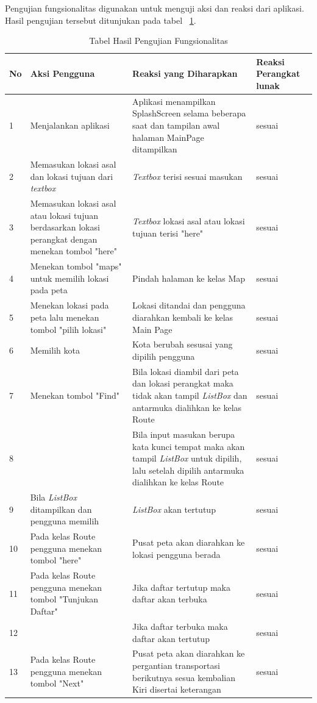 \iffalse
Pengujian fungsionalitas digunakan untuk menguji aksi dan reaksi dari aplikasi. Hasil pengujian tersebut ditunjukan pada tabel ~\ref{tab:TabelHasilPengujianFungsionalitas}.
\begin{table}[h!]
	\centering
		\begin{tabular}{|p{1cm}|p{4cm}|p{6cm}|p{3cm}|}\hline
				No & Aksi Pengguna & Reaksi yang Diharapkan & Reaksi Perangkat lunak \\ \hline
				1 & Menjalankan aplikasi & Aplikasi menampilkan SplashScreen selama beberapa saat dan tampilan awal halaman MainPage ditampilkan & sesuai \\ \hline
				2 & Memasukan lokasi asal dan lokasi tujuan dari \textit{textbox} & \textit{Textbox} terisi sesuai masukan & sesuai \\ \hline
				3 & Memasukan lokasi asal atau lokasi tujuan berdasarkan lokasi perangkat dengan menekan tombol "here" & \textit{Textbox} lokasi asal atau lokasi tujuan terisi "here" & sesuai \\ \hline
				4 & Menekan tombol "maps" untuk memilih lokasi pada peta & Pindah halaman ke kelas Map & sesuai \\ \hline
				5 & Menekan lokasi pada peta lalu menekan tombol "pilih lokasi" & Lokasi ditandai dan pengguna diarahkan kembali ke kelas Main Page & sesuai \\ \hline
				6 & Memilih kota & Kota berubah sesusai yang dipilih pengguna & sesuai \\ \hline
				7 & Menekan tombol "Find" & Bila lokasi diambil dari peta dan lokasi perangkat maka tidak akan tampil \textit{ListBox} dan antarmuka dialihkan ke kelas Route & sesuai \\ \hline
				8 & & Bila input masukan berupa kata kunci tempat maka akan tampil \textit{ListBox} untuk dipilih, lalu setelah dipilih antarmuka dialihkan ke kelas Route & sesuai \\ \hline
				9 & Bila \textit{ListBox} ditampilkan dan pengguna memilih & \textit{ListBox} akan tertutup & sesuai \\ \hline
				10 & Pada kelas Route pengguna menekan tombol "here" & Pusat peta akan diarahkan ke lokasi pengguna berada & sesuai \\ \hline
				11 & Pada kelas Route pengguna menekan tombol "Tunjukan Daftar" & Jika daftar tertutup maka daftar akan terbuka & sesuai \\ \hline
				12 & & Jika daftar terbuka maka daftar akan tertutup & sesuai \\ \hline
				13 & Pada kelas Route pengguna menekan tombol "Next" & Pusat peta akan diarahkan ke pergantian transportasi berikutnya sesua kembalian Kiri disertai keterangan & sesuai \\ \hline
		\end{tabular}
	\caption{Tabel Hasil Pengujian Fungsionalitas}
	\label{tab:TabelHasilPengujianFungsionalitas}
\end{table}

